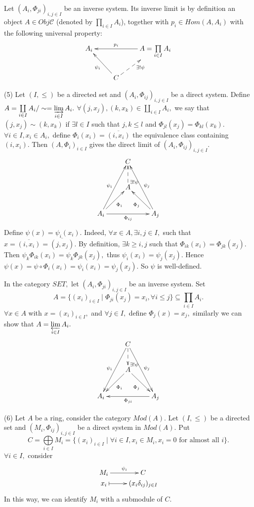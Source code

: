 \begin{egs}
Let $(A_i,\Phi_{ji})_{i,j\in I}$ be an inverse system. Its inverse
limit is by definition an object $A\in Obj\mathscr{C}$ (denoted by
$\prod\limits_{i\in I}A_i$), together with $p_i\in Hom(A,A_i)$ with
the following universal property:
\[ \xymatrix{
   A_i & & {A=\prod\limits_{i\in I}A_i} \ar[ll]_-{p_i}  \\
   & C \ar[ul]^{\psi_i} \ar@{-->}[ur]_{\exists!\psi} }  \]
\item[(5)]Let $(I, \leqslant)$ be a directed set and $(A_i,
\Phi_{ij})_{i,j\in I}$ be a direct system. Define
$A=\coprod\limits_{i\in I}A_i/\sim=\varinjlim\limits_{i\in I}A_i.$
$\forall (j,x_j),(k,x_k)\in \coprod\limits_{i\in I}A_i,$ we say that
$(j,x_j)\sim(k,x_k)$ if $\exists l\in I$ such that $j,k\leqslant l$
and $\Phi_{jl}(x_j)=\Phi_{kl}(x_k).$ $\forall i\in I,x_i\in A_i,$
define $\Phi_i(x_i)=\overline{(i,x_i)}$ the equivalence class
containing $(i,x_i).$ Then $(A,\Phi_i)_{i\in I}$ gives the direct
limit of $(A_i,\Phi_{ij})_{i,j\in I}.$
\[ \xymatrix{
   & C \\
   & A \ar@{-->}[u]_(.2){\exists!\psi} \\
   A_i \ar"1,2"^{\psi_i} \ar[ur]_{\Phi_i} \ar[rr]_{\Phi_{ij}} & &
   A_j \ar"1,2"_{\psi_j} \ar[ul]^{\Phi_j} }  \]
Define $\psi(x)=\psi_i(x_i).$ Indeed, $\forall x\in A, \exists
i,j\in I,$ such that $x=\overline{(i,x_i)}=\overline{(j,x_j)}.$ By
definition, $\exists k\geqslant i,j$ such that
$\Phi_{ik}(x_i)=\Phi_{jk}(x_j).$ Then
$\psi_k\Phi_{ik}(x_i)=\psi_k\Phi_{jk}(x_j),$ thus
$\psi_i(x_i)=\psi_j(x_j).$ Hence
$\psi(x)=\psi\circ\Phi_i(x_i)=\psi_i(x_i)=\psi_j(x_j).$ So $\psi$ is
well-defined.

In the category $SET,$ let $(A_i,\Phi_{ji})_{i,j\in I}$ be an
inverse system. Set
$$A=\{(x_i)_{i\in I}\mid \Phi_{ji}(x_j)=x_i,\forall i\leqslant j\}\subseteq \prod\limits_{i\in I}A_i.$$
$\forall x\in A$ with $x=(x_i)_{i\in I},$ and $\forall j\in I,$
define $\Phi_j(x)=x_j,$ similarly we can show that
$A=\varprojlim\limits_{i\in I}A_i.$
\[ \xymatrix{
   & C \ar"3,1"_{\psi_i} \ar@{-->}[d]^(.8){\exists!\psi}
   \ar"3,3"^{\psi_j}\\
   & A \ar[dl]^{\Phi_i} \ar[dr]_{\Phi_j}  \\
   A_i & & A_j \ar[ll]^{\Phi_{ji}} }  \]
\item[(6)]Let $A$ be a ring, consider the category $Mod(A).$
Let $(I, \leqslant)$ be a directed set and $(M_i, \Phi_{ij})_{i,j\in
I}$ be a direct system in $Mod(A).$ Put
$$C=\bigoplus\limits_{i\in I}M_i=\{(x_i)_{i\in I}\mid \forall i\in I, x_i\in M_i, x_i=0 \text{ for almost all }i\}.$$
$\forall i\in I,$ consider
\[ \xymatrix@R=0em{
   M_i \ar[r]^-{\psi_i} & C  \\
   x_i \ar@{|->}[r] & (x_i\delta_{ij})_{j\in I} }  \]
In this way, we can identify $M_i$ with a submodule of $C.$


\end{egs}
